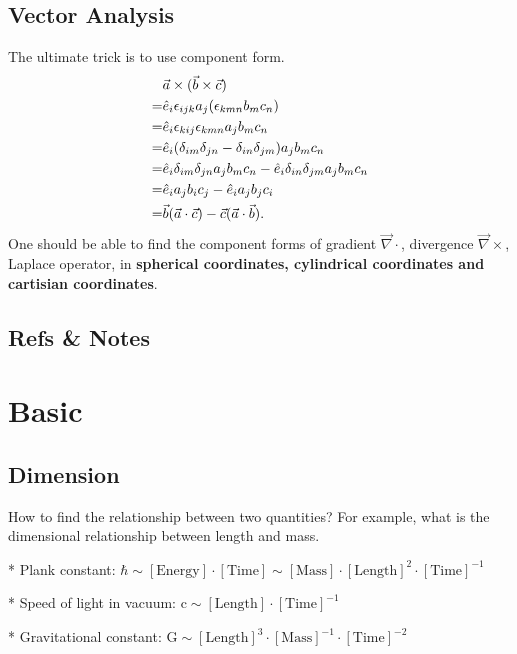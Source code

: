 \documentclass[letterpaper,10pt,english]{sphinxmanual}
\begin{document}
\subsection{Vector Analysis}
\label{voc/vocabulary:vector-analysis}
The ultimate trick is to use component form.
\begin{gather}
\begin{split}&\vec a \times (\vec b \times \vec c) \\
= & \hat e_i \epsilon_{ijk} a_j (\epsilon_{kmn} b_m c_n ) \\
= & \hat e_i \epsilon_{kij}\epsilon_{kmn} a_j b_m c_n \\
= & \hat e_i ( \delta_{im}\delta_{jn} - \delta_{in}\delta_{jm} )a_j b_m c_n \\
= & \hat e_i \delta_{im}\delta_{jn} a_j b_m c_n -  \hat e_i \delta_{in}\delta_{jm} a_j b_m c_n \\
= & \hat e_i a_j b_i c_j - \hat e_i a_j b_j c_i \\
= & \vec b (\vec a\cdot \vec c) - \vec c (\vec a \cdot \vec b) .\end{split}\notag
\end{gather}
One should be able to find the component forms of gradient \(\vec \nabla \cdot\), divergence \(\vec \nabla \times\), Laplace operator, in \textbf{spherical coordinates, cylindrical coordinates and cartisian coordinates}.


\subsection{Refs \& Notes}
\label{voc/vocabulary:refs-notes}

\section{Basic}
\label{Basic::doc}\label{Basic:basic}

\subsection{Dimension}
\label{Basic:dimension}
How to find the relationship between two quantities? For example, what is the dimensional relationship between length and mass.

\begin{DUlineblock}{0em}
\item[] * Plank constant: \(\mathrm{ \hbar \sim [Energy]\cdot [Time] \sim [Mass]\cdot [Length]^2 \cdot [Time]^{-1} }\)
\item[] * Speed of light in vacuum: \(\mathrm{ c\sim [Length]\cdot [Time]^{-1} }\)
\item[] * Gravitational constant: \(\mathrm{  G \sim [Length]^3\cdot [Mass]^{-1} \cdot [Time]^{-2} }\)
\end{DUlineblock}
\end{document}
